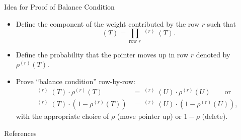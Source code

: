 \documentclass[aspectratio = 1609]{beamer}
\theoremstyle{definition}
\theoremstyle{plain} %
\DeclareMathOperator{\wtqt}{wt_{\mathit{q, t}}}
\begin{document}
\begin{frame}{Idea for Proof of Balance Condition}
  \begin{itemize} \itemsep .5em
    \item Define the component of the weight contributed by the row \(r\) such that
    \begin{equation*}
      \wtqt(T) = \prod_{\text{row } r} \wtqt^{(r)}(T).
    \end{equation*}
    \item Define the probability that the pointer moves up in row \(r\) denoted by \(\rho^{(r)}(T)\).
    \item Prove ``balance condition'' row-by-row:
    \begin{align*}
      \wtqt^{(r)}(T) \cdot \rho^{(r)}(T) &= \wtqt^{(r)}(U) \cdot \rho^{(r)}(U) \qquad \text{or} \\
      \wtqt^{(r)}(T) \cdot \left( 1 - \rho^{(r)}(T) \right) &= \wtqt^{(r)}(U) \cdot \left( 1 - \rho^{(r)}(U) \right),
    \end{align*}
    with the appropriate choice of \(\rho\) (move pointer up) or \(1 - \rho\) (delete).
  \end{itemize}
\end{frame}

\begin{frame}{References}
  \AtNextBibliography{\small}
  \printbibliography
\end{frame}
\end{document}
